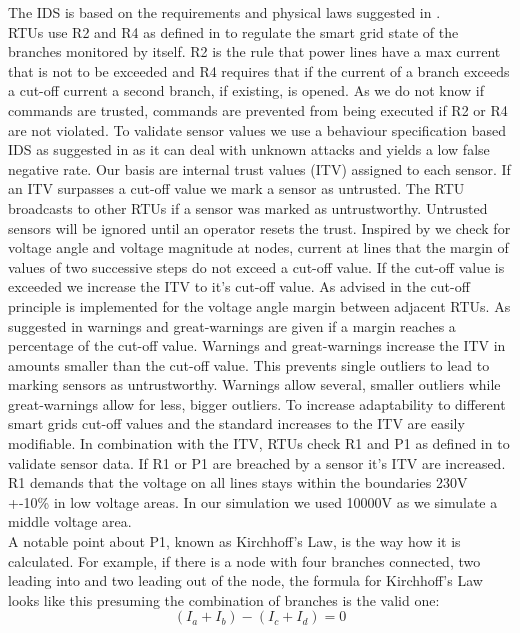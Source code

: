 		The IDS is based on the requirements and physical laws suggested in \cite{chromik1}. \\
		RTUs use R2 and R4 as defined in \cite{chromik1} to regulate the smart grid state of the branches monitored by itself. R2 is the rule that power lines have a max current that is not to be exceeded and R4 requires that if the current of a branch exceeds a cut-off current a second branch, if existing, is opened. As we do not know if commands are trusted, commands are prevented from being executed if R2 or R4 are not violated. To validate sensor values we use a behaviour specification based IDS as suggested in \cite{chromik2} as it can deal with unknown attacks and yields a low false negative rate. Our basis are internal trust values (ITV) assigned to each sensor. If an ITV surpasses a cut-off value we mark a sensor as untrusted. The RTU broadcasts to other RTUs if a sensor was marked as untrustworthy. Untrusted sensors will be ignored until an operator resets the trust. Inspired by \cite{blithe} we check for voltage angle and voltage magnitude at nodes, current at lines that the margin of values of two successive steps do not exceed a cut-off value. If the cut-off value is exceeded we increase the ITV to it's cut-off value. As advised in \cite{blithe} the cut-off principle is implemented for the voltage angle margin between adjacent RTUs. As suggested in \cite{blithe} warnings and great-warnings are given if a margin reaches a percentage of the cut-off value. Warnings and great-warnings increase the ITV in amounts smaller than the cut-off value. This prevents single outliers to lead to marking sensors as untrustworthy. Warnings allow several, smaller outliers while great-warnings allow for less, bigger outliers. To increase adaptability to different smart grids cut-off values and the standard increases to the ITV are easily modifiable. In combination with the ITV, RTUs check R1 and P1 as defined in \cite{chromik1} to validate sensor data. If R1 or P1 are breached by a sensor it's ITV are increased. R1 demands that the voltage on all lines stays within the boundaries 230V +-10\% in low voltage areas. In our simulation we used 10000V as we simulate a middle voltage area. \\
		A notable point about P1, known as Kirchhoff's Law, is the way how it is calculated.
		For example, if there is a node with four branches connected, two leading into and two leading out of the node, the formula for Kirchhoff's Law looks like this presuming the combination of branches is the valid one:
		\begin{equation}
		(I_a + I_b) - (I_c + I_d) = 0
		\label{eq:klaw}
		\end{equation}
